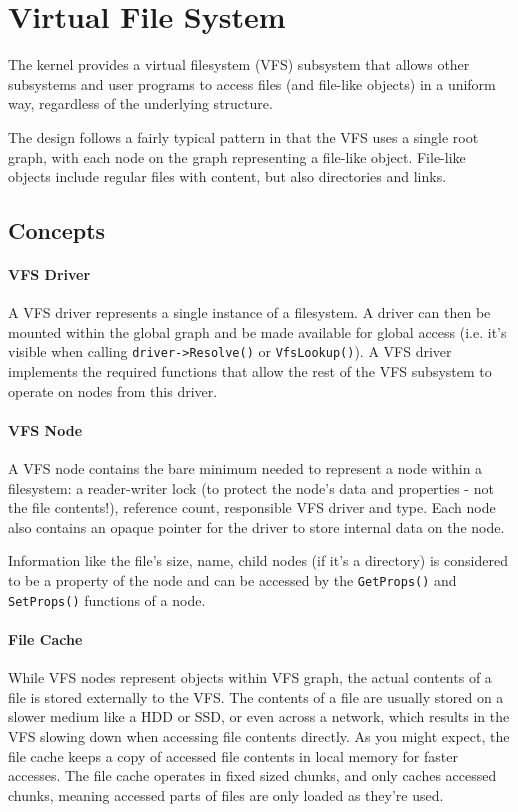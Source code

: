 \section{Virtual File System}
The kernel provides a virtual filesystem (VFS) subsystem that allows other subsystems and user programs to access files (and file-like objects) in a uniform way, regardless of the underlying structure.

The design follows a fairly typical pattern in that the VFS uses a single root graph, with each node on the graph representing a file-like object. File-like objects include regular files with content, but also directories and links.

\subsection{Concepts}
\paragraph{VFS Driver}
A VFS driver represents a single instance of a filesystem. A driver can then be mounted within the global graph and be made available for global access (i.e. it's visible when calling \verb|driver->Resolve()| or \verb|VfsLookup()|). A VFS driver implements the required functions that allow the rest of the VFS subsystem to operate on nodes from this driver.

\paragraph{VFS Node}
A VFS node contains the bare minimum needed to represent a node within a filesystem: a reader-writer lock (to protect the node's data and properties - not the file contents!), reference count, responsible VFS driver and type. Each node also contains an opaque pointer for the driver to store internal data on the node. 

Information like the file's size, name, child nodes (if it's a directory) is considered to be a property of the node and can be accessed by the \verb|GetProps()| and \verb|SetProps()| functions of a node.

\paragraph{File Cache}
While VFS nodes represent objects within VFS graph, the actual contents of a file is stored externally to the VFS. The contents of a file are usually stored on a slower medium like a HDD or SSD, or even across a network, which results in the VFS slowing down when accessing file contents directly. As you might expect, the file cache keeps a copy of accessed file contents in local memory for faster accesses. The file cache operates in fixed sized chunks, and only caches accessed chunks, meaning accessed parts of files are only loaded as they're used.

